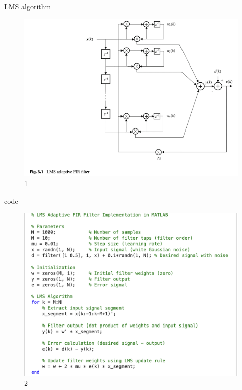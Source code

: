 \documentclass{beamer}
\begin{document}
\begin{frame}{LMS algorithm}
    \begin{figure}[htbp]
        \centering
        \vspace{-0.0cm}
        \includegraphics[scale=0.4]{pic/lms.png}
        \caption{1}
    \end{figure}
\end{frame}

\begin{frame}{code}
    \begin{figure}[htbp]
        \centering
        \vspace{-0.0cm}
        \includegraphics[scale=0.4]{pic/lms-code.png}
        \caption{2}
    \end{figure}
\end{frame}
\end{document}
